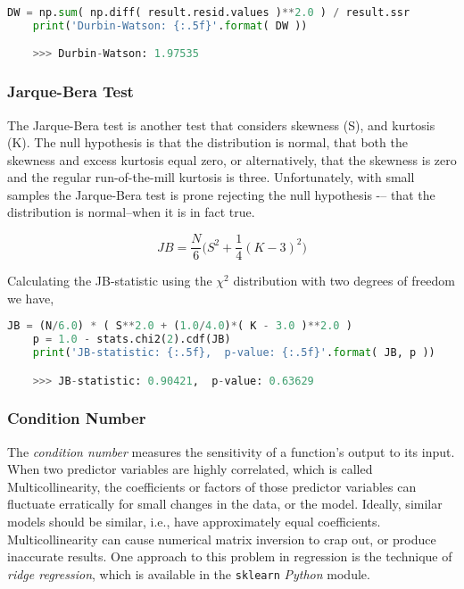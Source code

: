  \begin{lstlisting}[language=Python]
    DW = np.sum( np.diff( result.resid.values )**2.0 ) / result.ssr
    print('Durbin-Watson: {:.5f}'.format( DW ))

    >>> Durbin-Watson: 1.97535
\end{lstlisting}

\subsubsection{Jarque-Bera Test}

The Jarque-Bera test is another test that considers skewness (S), and kurtosis (K). The null hypothesis is that the distribution is normal, that both the skewness and excess kurtosis equal zero, or alternatively, that the skewness is zero and the regular run-of-the-mill kurtosis is three. Unfortunately, with small samples the Jarque-Bera test is prone rejecting the null hypothesis -– that the distribution is normal–when it is in fact true.

\begin{equation}
     JB = \dfrac{N}{6} \biggl( S^{2} + \dfrac{1}{4}(K-3)^{2} \biggr)
\end{equation}

Calculating the JB-statistic using the $\chi^{2}$ distribution with two degrees of freedom we have,

\begin{lstlisting}[language=Python]
    JB = (N/6.0) * ( S**2.0 + (1.0/4.0)*( K - 3.0 )**2.0 )
    p = 1.0 - stats.chi2(2).cdf(JB)
    print('JB-statistic: {:.5f},  p-value: {:.5f}'.format( JB, p ))

    >>> JB-statistic: 0.90421,  p-value: 0.63629

\end{lstlisting}

\subsubsection{Condition Number}

The \emph{condition number}  measures the sensitivity of a function's output to its input. When two predictor variables are highly correlated, which is called Multicollinearity, the coefficients or factors of those predictor variables can fluctuate erratically for small changes in the data, or the model. Ideally, similar models should be similar, i.e., have approximately equal coefficients. Multicollinearity can cause numerical matrix inversion to crap out, or produce inaccurate results. One approach to this problem in regression is the technique of \emph{ridge regression}, which is available in the \texttt{sklearn} \emph{Python} module.

